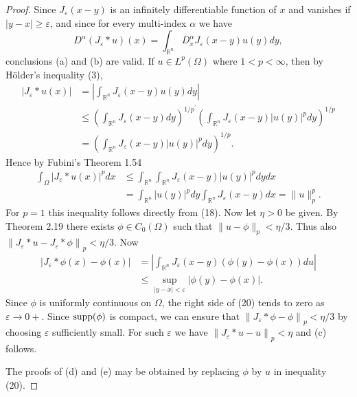 \begin{proof}
  Since $J_\varepsilon(x-y)$ is an infinitely differentiable function of $x$ and vanishes if $|y-x| \geq \varepsilon$, and since for every multi-index $\alpha$ we have
  \[
  D^\alpha\left(J_\varepsilon * u\right)(x)=\int_{\mathbb{R}^n} D_x^\alpha J_\varepsilon(x-y) u(y) d y,
  \]
  conclusions (a) and (b) are valid.
  If $u \in L^p(\Omega)$ where $1<p<\infty$, then by Hölder's inequality (3),
  \[
  \begin{aligned}
  \left|J_\varepsilon * u(x)\right| & =\left|\int_{\mathbb{R}^n} J_\varepsilon(x-y) u(y) d y\right| \\
  & \leq\left(\int_{\mathbb{R}^n} J_\varepsilon(x-y) d y\right)^{1 / p^{\prime}}\left(\int_{\mathbb{R}^n} J_\varepsilon(x-y)|u(y)|^p d y\right)^{1 / p} \\
  & =\left(\int_{\mathbb{R}^n} J_\varepsilon(x-y)|u(y)|^p d y\right)^{1 / p} .
  \end{aligned}
  \]
  Hence by Fubini's Theorem 1.54
  \[
  \begin{aligned}
  \int_{\Omega}\left|J_\varepsilon * u(x)\right|^p d x & \leq \int_{\mathbb{R}^n} \int_{\mathbb{R}^n} J_\varepsilon(x-y)|u(y)|^p d y d x \\
  & =\int_{\mathbb{R}^n}|u(y)|^p d y \int_{\mathbb{R}^n} J_\varepsilon(x-y) d x=\|u\|_p^p .
  \end{aligned}
  \]
  For $p=1$ this inequality follows directly from (18).
  Now let $\eta>0$ be given. By Theorem 2.19 there exists $\phi \in C_0(\Omega)$ such that $\|u-\phi\|_p<\eta / 3$. Thus also $\left\|J_\varepsilon * u-J_\varepsilon * \phi\right\|_p<\eta / 3$. Now
  \[
  \begin{aligned}
  \left|J_\varepsilon * \phi(x)-\phi(x)\right| & =\left|\int_{\mathbb{R}^n} J_\varepsilon(x-y)(\phi(y)-\phi(x)) d u\right| \\
  & \leq \sup _{|y-x|<\varepsilon}|\phi(y)-\phi(x)| .
  \end{aligned}
  \]
  Since $\phi$ is uniformly continuous on $\Omega$, the right side of (20) tends to zero as $\varepsilon \rightarrow 0+$. Since $\operatorname{supp}(\phi)$ is compact, we can ensure that $\left\|J_\varepsilon * \phi-\phi\right\|_p<\eta / 3$
  by choosing $\varepsilon$ sufficiently small. For such $\varepsilon$ we have $\left\|J_\varepsilon * u-u\right\|_p<\eta$ and (c) follows.
  
  The proofs of (d) and (e) may be obtained by replacing $\phi$ by $u$ in inequality (20).
\end{proof}


